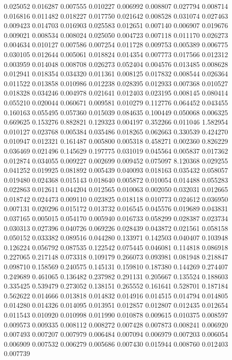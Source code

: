 0.025052
0.016287
0.007555
0.010227
0.006992
0.008807
0.027794
0.008714
0.016816
0.011482
0.018227
0.017750
0.021642
0.008528
0.031074
0.027463
0.009423
0.014703
0.016903
0.025583
0.012651
0.007140
0.006907
0.019676
0.009021
0.008534
0.008024
0.025050
0.004723
0.007118
0.011170
0.026273
0.004634
0.010127
0.007586
0.007254
0.011728
0.009753
0.005389
0.006775
0.030105
0.012644
0.005061
0.018824
0.014354
0.007773
0.017566
0.012312
0.003959
0.014048
0.008708
0.026273
0.052404
0.004576
0.013485
0.008628
0.012941
0.018354
0.034320
0.011361
0.008125
0.017832
0.008544
0.026364
0.011522
0.013858
0.010986
0.012238
0.028395
0.012933
0.007368
0.010527
0.018328
0.034246
0.004978
0.021641
0.012403
0.023195
0.008145
0.080414
0.055210
0.020044
0.060671
0.009581
0.010279
0.112776
0.064452
0.043455
0.160163
0.055495
0.057360
0.015039
0.084635
0.100449
0.050068
0.006325
0.669625
0.153276
0.882821
0.129323
0.004197
0.352266
0.011046
1.582954
0.010127
0.023768
0.005384
0.035486
0.018265
0.062663
0.330539
0.424270
0.010947
0.012321
0.161487
0.005800
0.005318
0.458271
0.002360
0.826229
0.036469
0.021496
0.145629
0.197775
0.031019
0.045564
0.005837
0.017362
0.012874
0.034055
0.009227
0.002699
0.009452
0.075097
8.120368
0.029255
0.041252
0.019925
0.081892
0.005439
0.040093
0.018163
0.035432
0.058057
0.019480
0.024368
0.015143
0.018640
0.005872
0.010054
0.014488
0.055283
0.022863
0.012611
0.044204
0.012565
0.010063
0.002050
0.032031
0.012665
0.018742
0.024473
0.009110
0.023825
0.018118
0.010773
0.024612
0.036950
0.007131
0.020296
0.015172
0.013732
0.016545
0.045576
0.019689
0.043831
0.037165
0.005015
0.054170
0.005940
0.016733
0.058299
0.028387
0.023734
0.030313
0.027396
0.040726
0.069226
0.028439
0.043872
0.021561
0.058158
0.050152
0.033382
0.089516
0.044280
0.133971
0.142503
0.040407
0.103948
0.126224
0.056792
0.087535
0.122542
0.075445
0.046081
0.114818
0.086918
0.227065
0.217148
0.073318
0.109179
0.266073
0.093981
0.081948
0.218847
0.098710
0.158569
0.240575
0.145131
0.159810
0.187380
0.144269
0.274407
0.249689
0.461065
0.136482
0.237982
0.291131
0.205667
0.135524
0.188603
0.335425
0.539479
0.273052
0.138151
0.265552
0.161641
0.528701
0.187184
0.562622
0.014666
0.013818
0.014832
0.014916
0.014515
0.014794
0.014805
0.014280
0.014326
0.014095
0.013951
0.012857
0.012807
0.012435
0.012654
0.011543
0.010920
0.010998
0.011990
0.010878
0.009615
0.010375
0.008597
0.009573
0.009335
0.008112
0.008272
0.007428
0.007873
0.008241
0.006920
0.007493
0.007207
0.007979
0.006484
0.007094
0.006979
0.007203
0.006054
0.006909
0.007532
0.006279
0.005686
0.007430
0.015944
0.008760
0.012403
0.007739
